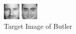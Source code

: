\documentclass[12pt]{article} %
\begin{document}
\begin{figure}[H] %
  \centering 
  \begin{minipage}[b]{0.2\textwidth}
    \includegraphics[width=\textwidth]{part3_3_5_correct_butler}
    \caption{Target Image of Butler}
  \end{minipage}
  \begin{minipage}[b]{0.1\textwidth}
    \includegraphics[width=\textwidth]{part3_3_5_error1_radcliffe}

\end{minipage}
\end{figure}
\end{document}
